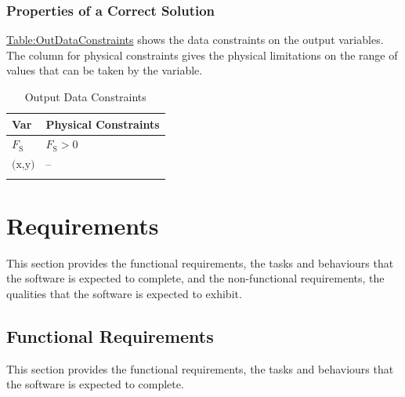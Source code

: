 \documentclass[12pt]{article}
\begin{document}
\subsubsection{Properties of a Correct Solution}
\label{Sec:CorSolProps}
\hyperref[Table:OutDataConstraints]{Table:OutDataConstraints} shows the data constraints on the output variables. The column for physical constraints gives the physical limitations on the range of values that can be taken by the variable.

\begin{longtable}{l l}
\toprule
\textbf{Var} & \textbf{Physical Constraints}
\\
\midrule
\endhead
${F_{\text{S}}}$ & ${F_{\text{S}}}>0$
\\
$\text{(x,y)}$ & --
\\
\bottomrule
\caption{Output Data Constraints}
\label{Table:OutDataConstraints}
\end{longtable}
\section{Requirements}
\label{Sec:Requirements}
This section provides the functional requirements, the tasks and behaviours that the software is expected to complete, and the non-functional requirements, the qualities that the software is expected to exhibit.

\subsection{Functional Requirements}
\label{Sec:FRs}
This section provides the functional requirements, the tasks and behaviours that the software is expected to complete.
\end{document}

